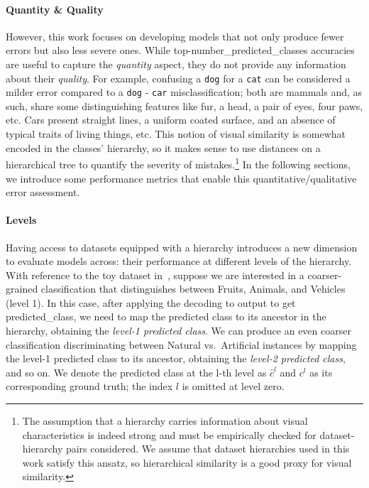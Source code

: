 \paragraph{Quantity \& Quality}
\label{par:metrics-quantity-quality}
However, this work focuses on developing models that not only produce fewer errors but also less severe ones. While top-\gls{number_predicted_classes} accuracies are useful to capture the \emph{quantity} aspect, they do not provide any information about their \emph{quality}.
For example, confusing a \texttt{dog} for a \texttt{cat} can be considered a milder error compared to a \texttt{dog} - \texttt{car} misclassification; both are mammals and, as such, share some distinguishing features like fur, a head, a pair of eyes, four paws, etc. Cars present straight lines, a uniform coated surface, and an absence of typical traits of living things, etc.
This notion of visual similarity is somewhat encoded in the classes' hierarchy, so it makes sense to use distances on a hierarchical tree to quantify the severity of mistakes.\footnote{The assumption that a hierarchy carries information about visual characteristics is indeed strong and must be empirically checked for dataset-hierarchy pairs considered.
We assume that dataset hierarchies used in this work satisfy this ansatz, so hierarchical similarity is a good proxy for visual similarity.} In the following sections, we introduce some performance metrics that enable this quantitative/qualitative error assessment.

\paragraph{Levels}
\label{par:metrics-levels}
Having access to datasets equipped with a hierarchy introduces a new dimension to evaluate models across: their performance at different levels of the hierarchy.
With reference to the toy dataset in~, suppose we are interested in a coarser-grained classification that distinguishes between Fruits, Animals, and Vehicles (level 1). In this case, after applying the decoding to \gls{output} to get \gls{predicted_class}, we need to map the predicted class to its ancestor in the hierarchy, obtaining the \emph{level-1 predicted class}. We can produce an even coarser classification discriminating between Natural vs.\ Artificial instances by mapping the level-1 predicted class to its ancestor, obtaining the \emph{level-2 predicted class}, and so on.
We denote the predicted class at the l-th level as $\hat{c}^l$ and $c^l$ as its corresponding ground truth; the index $l$ is omitted at level zero.

